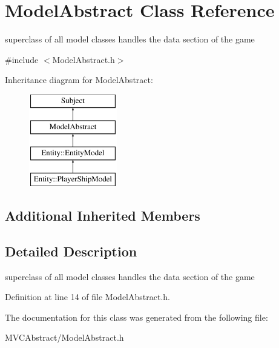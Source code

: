 \hypertarget{classModelAbstract}{}\section{Model\+Abstract Class Reference}
\label{classModelAbstract}


superclass of all model classes handles the data section of the game  




{\ttfamily \#include $<$Model\+Abstract.\+h$>$}

Inheritance diagram for Model\+Abstract\+:\begin{figure}[H]
\begin{center}
\leavevmode
\includegraphics[height=4.000000cm]{classModelAbstract}
\end{center}
\end{figure}
\subsection*{Additional Inherited Members}


\subsection{Detailed Description}
superclass of all model classes handles the data section of the game 

Definition at line 14 of file Model\+Abstract.\+h.



The documentation for this class was generated from the following file\+:\begin{DoxyCompactItemize}
\item 
M\+V\+C\+Abstract/Model\+Abstract.\+h\end{DoxyCompactItemize}
